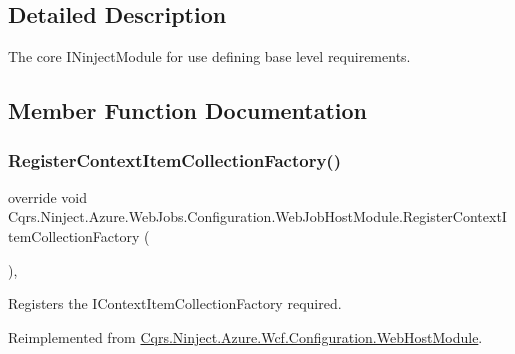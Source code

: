 \subsection{Detailed Description}
The core I\+Ninject\+Module for use defining base level requirements. 



\subsection{Member Function Documentation}
\mbox{\label{classCqrs_1_1Ninject_1_1Azure_1_1WebJobs_1_1Configuration_1_1WebJobHostModule_a478ea88f9dd4740ffd11b5d169683e2b_a478ea88f9dd4740ffd11b5d169683e2b}} 
\subsubsection{\texorpdfstring{Register\+Context\+Item\+Collection\+Factory()}{RegisterContextItemCollectionFactory()}}
{\footnotesize\ttfamily override void Cqrs.\+Ninject.\+Azure.\+Web\+Jobs.\+Configuration.\+Web\+Job\+Host\+Module.\+Register\+Context\+Item\+Collection\+Factory (\begin{DoxyParamCaption}{ }\end{DoxyParamCaption})\hspace{0.3cm}{\ttfamily [protected]}, {\ttfamily [virtual]}}



Registers the I\+Context\+Item\+Collection\+Factory required. 



Reimplemented from \hyperlink{classCqrs_1_1Ninject_1_1Azure_1_1Wcf_1_1Configuration_1_1WebHostModule_a796f167e2cf851a069bd92e4d9c10846_a796f167e2cf851a069bd92e4d9c10846}{Cqrs.\+Ninject.\+Azure.\+Wcf.\+Configuration.\+Web\+Host\+Module}.

